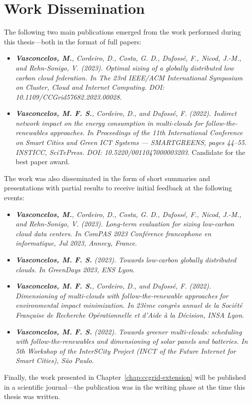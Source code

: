 \section{Work Dissemination}

\label{sec:conclusion_dissemination}

The following two main publications emerged from the work performed during this thesis---both in the format of full papers:

\begin{itemize}

\item  \textit{\textbf{Vasconcelos, M.}, Cordeiro, D., Costa, G. D., Dufossé, F., Nicod, J.-M., and Rehn-Sonigo, V. (2023). Optimal sizing of a globally distributed low carbon cloud federation. In The 23rd IEEE/ACM International Symposium on Cluster, Cloud and Internet Computing. DOI: 10.1109/CCGrid57682.2023.00028}.
  
\item  \textit{\textbf{Vasconcelos, M. F. S.}, Cordeiro, D., and Dufossé, F. (2022). Indirect network impact on the energy consumption in multi-clouds for follow-the-renewables approaches. In Proceedings of the 11th International Conference on Smart Cities and Green ICT Systems — SMARTGREENS, pages 44–55. INSTICC, SciTePress. DOI: 10.5220/0011047000003203}. Candidate for the best paper award.

\end{itemize}

The work was also disseminated in the form of short summaries and presentations with partial results to receive initial feedback at the following events:

\begin{itemize}

\item \textit{\textbf{Vasconcelos, M.}, Cordeiro, D., Costa, G. D., Dufossé, F., Nicod, J.-M., and Rehn-Sonigo, V. (2023). Long-term evaluation for sizing low-carbon cloud data centers. In ComPAS 2023 Conférence francophone en informatique, Jul 2023, Annecy, France}.

  \item  \textit{\textbf{Vasconcelos, M. F. S.} (2023). Towards low-carbon globally distributed clouds. In GreenDays 2023, ENS Lyon}.

\item  \textit{\textbf{Vasconcelos, M. F. S.}, Cordeiro, D., and Dufossé, F. (2022). Dimensioning of multi-clouds with follow-the-renewable approaches for environmental impact minimization. In 23ème congrès annuel de la Société Française de Recherche Opérationnelle et d’Aide à la Décision, INSA Lyon}.

\item  \textit{\textbf{Vasconcelos, M. F. S.} (2022). Towards greener multi-clouds: scheduling with follow-the-renewables and dimensioning of solar panels and batteries. In 5th Workshop of the InterSCity Project (INCT of the Future Internet for Smart Cities), São Paulo.}

\end{itemize}

Finally, the work presented in Chapter~\ref{chap:ccgrid-extension} will be published in a scientific journal---the publication was in the writing phase at the time this thesis was written.